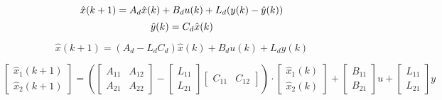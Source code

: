 \vspace{-0.5cm}
\begin{equation}
    \hat{x}(k+1) = A_d \hat{x}(k) + B_d u(k) + L_d (y(k) - \hat{y}(k)) \\        
\end{equation}
\vspace{-0.5cm}
\begin{equation}
    \hat{y}(k) = C_d \hat{x}(k) \\
\end{equation}

\vspace{-0.5cm}
\begin{equation}
    \hat{x}(k+1) = (A_d - L_d C_d) \hat{x}(k) + B_d u(k) + L_d y(k)
\end{equation}

\vspace{-0.5cm}
\begin{equation}
    \begin{bmatrix}
        \hat{x}_1(k+1) \\
        \hat{x}_2(k+1)
    \end{bmatrix}
    =
    \left(
        \begin{bmatrix}
            A_{11} & A_{12} \\
            A_{21} & A_{22}
        \end{bmatrix}
        -
        \begin{bmatrix}
            L_{11} \\
            L_{21}
        \end{bmatrix}
        \begin{bmatrix}
            C_{11} & C_{12}
        \end{bmatrix}    
    \right)
    \cdot
    \begin{bmatrix}
        \hat{x}_1(k) \\
        \hat{x}_2(k)
    \end{bmatrix}
    +
    \begin{bmatrix}
        B_{11} \\
        B_{21}
    \end{bmatrix}
    u
    +
    \begin{bmatrix}
        L_{11} \\
        L_{21}
    \end{bmatrix}
    y
\end{equation}

